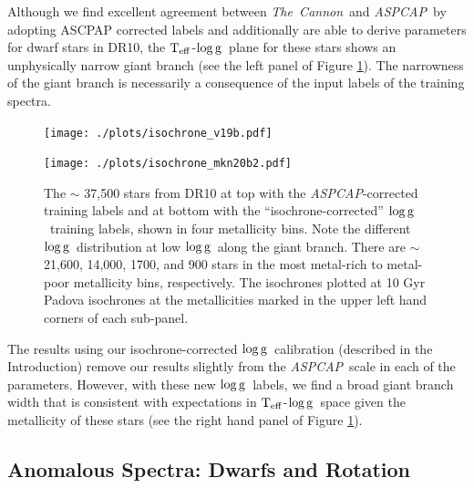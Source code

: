 \documentclass[12pt, preprint]{aastex}
\newcommand{\teff}{\mbox{$\rm T_{eff}$}}
\newcommand{\logg}{\mbox{$\rm \log g$}}
\newcommand{\tc}{\textsl{The~Cannon}}
\newcommand{\apogee}{\textsl{APOGEE}}
\newcommand{\aspcap}{\textsl{ASPCAP}}
\begin{document}
Although we find excellent agreement between \tc\ and \aspcap\ by adopting ASCPAP corrected labels and additionally are able to derive parameters for dwarf stars in DR10, the \teff-\logg\ plane for these stars shows an unphysically narrow giant branch  (see the left panel of Figure \ref{fig:iso}). The narrowness of the giant branch is necessarily a consequence of the input labels of the training spectra. 

\begin{figure}[!h]
\centering
  \vspace{-15pt}
  \texttt{[image: ./plots/isochrone\_v19b.pdf]}

    \texttt{[image: ./plots/isochrone\_mkn20b2.pdf]}
\caption{The $\sim$ 37,500 stars from DR10 at top with the \aspcap-corrected training labels and at bottom with the ``isochrone-corrected'' \logg\ training labels, shown in four metallicity bins. Note the different \logg\ distribution at low \logg\ along the giant branch. There are $\sim$ 21,600, 14,000, 1700, and 900 stars in the most metal-rich to metal-poor metallicity bins, respectively. The isochrones plotted at 10 Gyr Padova isochrones at the metallicities marked in the upper left hand corners of each sub-panel.}
\label{fig:iso}
\end{figure}


The results using our isochrone-corrected \logg\ calibration (described in the Introduction) remove our results slightly from the \aspcap\ scale in each of the parameters. However, with these new \logg\ labels, we find a broad giant branch width that is consistent with expectations in \teff-\logg\ space given the metallicity of these stars (see the right hand panel of Figure \ref{fig:iso}).





\subsection{Anomalous Spectra: Dwarfs and Rotation}
\end{document}
